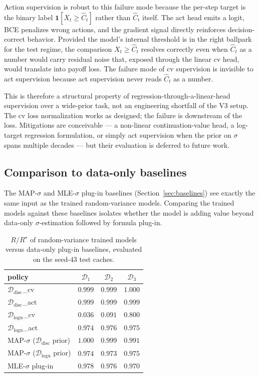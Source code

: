 \documentclass[11pt]{article}
\begin{document}
Action supervision is robust to this failure mode because the per-step target is the binary label $\mathbf{1}[X_t \ge \widehat C_t]$ rather than $\widehat C_t$ itself. The act head emits a logit, BCE penalizes wrong actions, and the gradient signal directly reinforces decision-correct behavior. Provided the model's internal threshold is in the right ballpark for the test regime, the comparison $X_t \ge \widehat C_t$ resolves correctly even when $\widehat C_t$ as a number would carry residual noise that, exposed through the linear cv head, would translate into payoff loss. The failure mode of cv supervision is invisible to act supervision because act supervision never reads $\widehat C_t$ as a number.

This is therefore a structural property of regression-through-a-linear-head supervision over a wide-prior task, not an engineering shortfall of the V3 setup. The cv loss normalization works as designed; the failure is downstream of the loss. Mitigations are conceivable --- a non-linear continuation-value head, a log-target regression formulation, or simply act supervision when the prior on $\sigma$ spans multiple decades --- but their evaluation is deferred to future work.

\subsection{Comparison to data-only baselines}
\label{sec:res-baselines}

The MAP-$\sigma$ and MLE-$\sigma$ plug-in baselines (Section~\ref{sec:baselines}) see exactly the same input as the trained random-variance models. Comparing the trained models against these baselines isolates whether the model is adding value beyond data-only $\sigma$-estimation followed by formula plug-in.

\begin{table}[H]
\centering
\small
\begin{tabular}{lccc}
\hline
policy & $\mathcal{D}_1$ & $\mathcal{D}_2$ & $\mathcal{D}_3$ \\
\hline
$\mathcal{D}_{\mathrm{disc}}$\_cv                         & $0.999$ & $0.999$ & $1.000$ \\
$\mathcal{D}_{\mathrm{disc}}$\_act                        & $0.999$ & $0.999$ & $0.999$ \\
$\mathcal{D}_{\mathrm{logu}}$\_cv                         & $0.036$ & $0.091$ & $0.800$ \\
$\mathcal{D}_{\mathrm{logu}}$\_act                        & $0.974$ & $0.976$ & $0.975$ \\
MAP-$\sigma$ ($\mathcal{D}_{\mathrm{disc}}$ prior)        & $1.000$ & $0.999$ & $0.991$ \\
MAP-$\sigma$ ($\mathcal{D}_{\mathrm{logu}}$ prior)        & $0.974$ & $0.973$ & $0.975$ \\
MLE-$\sigma$ plug-in                                      & $0.978$ & $0.976$ & $0.970$ \\
\hline
\end{tabular}
\caption{$R/R^\star$ of random-variance trained models versus data-only plug-in baselines, evaluated on the seed-$43$ test caches.}
\label{tab:res-baselines}
\end{table}
\end{document}
